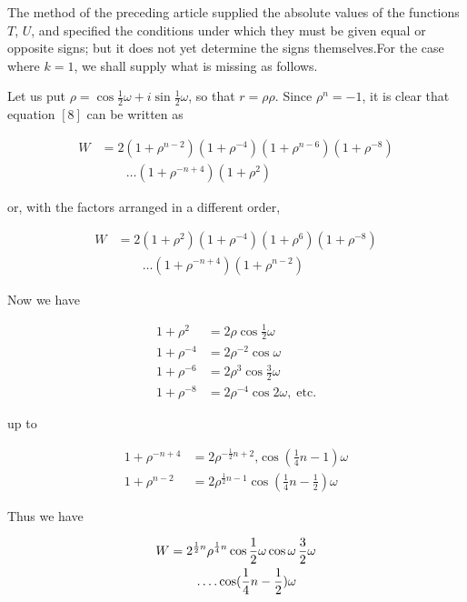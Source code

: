 
The method of the preceding article supplied the absolute values of the functions $T$, $U$, and specified the conditions under which they must be given equal or opposite signs; but it does not yet determine the signs themselves.\quad For the case where $k=1$, we shall supply what is missing as follows.

Let us put $\rho=\cos\frac12\omega+i\sin\frac12\omega$, so that $r=\rho\rho$. Since $\rho^n=-1$, it is clear that equation $[8]$ can be written as

\[
\begin{aligned}
W&=2(1+\rho^{n-2})(1+\rho^{-4})(1+\rho^{n-6})(1+\rho^{-8})\\&\qquad\ldots(1+\rho^{-n+4})(1+\rho^2)
\end{aligned}
\]

or, with the factors arranged in a different order,

\[
\begin{aligned}
W&=2(1+\rho^2)(1+\rho^{-4})(1+\rho^6)(1+\rho^{-8})\\&\qquad\ldots(1+\rho^{-n+4})(1+\rho^{n-2})
\end{aligned}
\]

Now we have

\[
\begin{aligned}
1+\rho^2&=2\rho\cos\frac12\omega\\
1+\rho^{-4}&=2\rho^{-2}\cos\omega\\
1+\rho^{-6}&=2\rho^3\cos\frac32\omega\\
1+\rho^{-8}&=2\rho^{-4}\cos2\omega,\;\text{etc.}
\end{aligned}
\]

up to

\[
\begin{aligned}
1+\rho^{-n+4}&=2\rho^{-\frac12n+2}\mathord{,}\cos(\frac14n-1)\omega\\
1+\rho^{n-2}&=2\rho^{\frac12n-1}\cos(\frac14n-\frac12)\omega
\end{aligned}
\]

Thus we have


\[
\begin{aligned}
W&=2^{\frac12n}\rho^{\frac14n}\cos\frac12\omega\cos\omega\,\frac32\omega\\&\qquad\mathinner{.\,.\,.\,.}\cos(\frac14n-\frac12)\omega
\end{aligned}
\]

